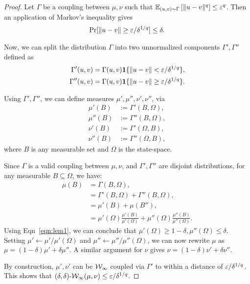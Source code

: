 \begin{proof}
Let $\Gamma$ be a coupling between $\mu, \nu$ such that $\operatorname*{\mathbb{E}}_{(u,v) \sim \Gamma} \left[ \|u - v\|^q \right] \leq \varepsilon^q$. Then an application of Markov's inequality gives
\begin{align}\label{eqn:lem1}
    \Pr[ \|u - v\| \geq \varepsilon / \delta^{1/q}] \leq \delta.
\end{align}

Now, we can split the distribution $\Gamma$ into two unnormalized components $\Gamma',\Gamma''$  defined as 
\begin{align*}
    \Gamma'(u,v) &= \Gamma(u,v) \bm{1}\{ \|u - v\|< \varepsilon / \delta^{1/q} \} ,\\
    \Gamma''(u,v) &= \Gamma(u,v) \bm{1}\{ \|u - v\| \geq \varepsilon / \delta^{1/q} \}.
\end{align*}

Using $\Gamma', \Gamma''$, we can define measures $\mu', \mu'', \nu', \nu''$, via
\begin{align*}
    \mu'(B) & := \Gamma'( B, \Omega),\\
    \mu''(B) & := \Gamma''( B, \Omega),\\
    \nu'(B) & := \Gamma'( \Omega, B),\\
    \nu''(B) & := \Gamma''( \Omega, B),
\end{align*}
where $B$ is any measurable set and $\Omega$ is the state-space.

Since $\Gamma$ is a valid coupling between $\mu, \nu$, and $\Gamma', \Gamma''$ are disjoint distributions, for any measurable $B\subseteq \Omega$, we have:
\begin{align*}
    \mu(B) &= \Gamma(B, \Omega) , \\
    &= \Gamma'(B, \Omega) + \Gamma''(B,\Omega),\\
    &= \mu'(B) + \mu(B''),\\
    &= \mu'(\Omega) \frac{\mu'(B)}{\mu'(\Omega)} + \mu''(\Omega) \frac{\mu''(B)}{\mu''(\Omega)}.
\end{align*}
Using Eqn~\eqref{eqn:lem1}, we can conclude that $\mu'(\Omega) \geq 1 - \delta, \mu''(\Omega) \leq \delta$.
Setting $\mu' \leftarrow \mu' / \mu'(\Omega)$ and $\mu'' \leftarrow \mu'' / \mu''(\Omega) $, we can now rewrite $\mu$ as $\mu = (1-\delta) \mu' + \delta \mu''$. A similar argument for $\nu$ gives $\nu = (1-\delta) \nu' + \delta \nu''$.

By construction, $\mu', \nu'$ can be $\mathcal W_\infty$ coupled via $\Gamma'$ to within a distance of $\varepsilon/ \delta^{1/q}$.
This shows that $(\delta, \delta)\text{-}\mathcal W_\infty(\mu, \nu) \leq \varepsilon / \delta^{1/q}$.



\end{proof}
